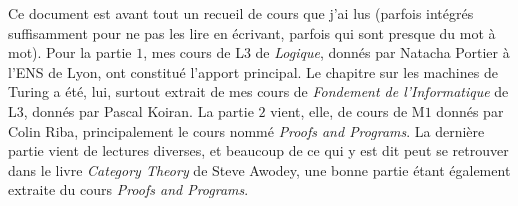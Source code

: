 \documentclass[11pt,french]{book}
\begin{document}
Ce document est avant tout un recueil de cours que j'ai lus (parfois intégrés suffisamment pour ne pas les lire en écrivant, parfois qui sont presque du mot à mot). Pour la partie $1$, mes cours de L3 de \textit{Logique}, donnés par Natacha Portier à l'ENS de Lyon, ont constitué l'apport principal. Le chapitre sur les machines de Turing a été, lui, surtout extrait de mes cours de \textit{Fondement de l'Informatique} de L3, donnés par Pascal Koiran. La partie $2$ vient, elle, de cours de M$1$ donnés par Colin Riba, principalement le cours nommé \textit{Proofs and Programs}. La dernière partie vient de lectures diverses, et beaucoup de ce qui y est dit peut se retrouver dans le livre \textit{Category Theory} de Steve Awodey, une bonne partie étant également extraite du cours \textit{Proofs and Programs}.


\thispagestyle{empty}

\newpage
\thispagestyle{empty}




\end{document}
